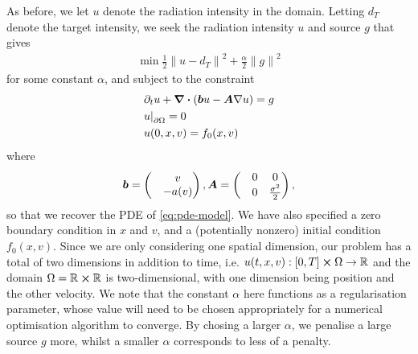 As before, we let $u$ denote the radiation intensity in the domain. Letting $d_T$ denote the target intensity, we seek the radiation intensity $u$ and source $g$ that gives
%
\begin{align} 
    \label{eq:to-minimise}
    \min \frac{1}{2} {\lVert u - d_T \rVert}^2 + \frac{\alpha}{2} {\lVert g \rVert}^2
\end{align}
%
for some constant $\alpha$, and subject to the constraint
%
\begin{align}
    \label{eq:pde-constraint}
    &\partial_t u + \div{(\boldsymbol{b} u - \boldsymbol{A} \nabla u)} = g\\
    &{u \rvert}_{\partial \Omega} = 0\\
    & u(0,x,v) = f_0(x,v)
\end{align}
%
where 
%
\begin{equation}
    \boldsymbol{b} = 
    \begin{pmatrix}
        &v\\
        &-a(v)
    \end{pmatrix},
    \boldsymbol{A} = 
    \begin{pmatrix}
        &0 &0\\
        &0 &\frac{\sigma^2}{2}
    \end{pmatrix},
    \end{equation}
so that we recover the PDE of \autoref{eq:pde-model}. We have also specified a zero boundary condition in $x$ and $v$, and a (potentially nonzero) initial condition $f_0(x,v)$. Since we are only considering one spatial dimension, our problem has a total of two dimensions in addition to time, i.e. $u(t,x,v): [0,T] \cross \Omega \rightarrow \mathbb{R}$ and the domain $\Omega=\mathbb{R}\cross\mathbb{R}$ is two-dimensional, with one dimension being position and the other velocity. We note that the constant $\alpha$ here functions as a regularisation parameter, whose value will need to be chosen appropriately for a numerical optimisation algorithm to converge. By chosing a larger $\alpha$, we penalise a large source $g$ more, whilst a smaller $\alpha$ corresponds to less of a penalty.


